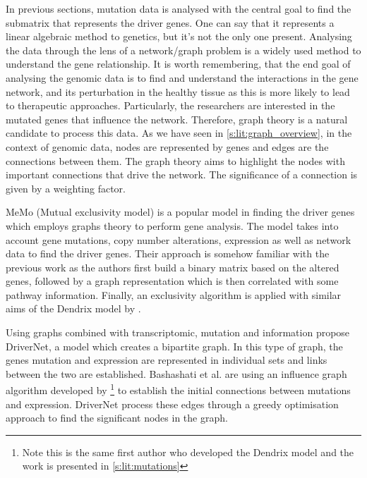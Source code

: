 In previous sections, mutation data is analysed with the central goal to find the submatrix that represents the driver genes. One can say that it represents a linear algebraic method to genetics, but it's not the only one present. Analysing the data through the lens of a network/graph problem is a widely used method to understand the gene relationship. It is worth remembering, that the end goal of analysing the genomic data is to find and understand the interactions in the gene network, and its perturbation in the healthy tissue as this is more likely to lead to therapeutic approaches. Particularly, the researchers are interested in the mutated genes that influence the network. Therefore, graph theory is a natural candidate to process this data. As we have seen in \cref{s:lit:graph_overview}, in the context of genomic data, nodes are represented by genes and edges are the connections between them. The graph theory aims to highlight the nodes with important connections that drive the network. The significance of a connection is given by a weighting factor.

MeMo (Mutual exclusivity model)\cite{Ciriello2012-hi} is a popular model in finding the driver genes which employs graphs theory to perform gene analysis. The model takes into account gene mutations, copy number alterations, expression as well as network data to find the driver genes. Their approach is somehow familiar with the previous work as the authors first build a binary matrix based on the altered genes, followed by a graph representation which is then correlated with some pathway information. Finally, an exclusivity algorithm is applied with similar aims of the Dendrix model by \citet{Vandin2012-cf}.

Using graphs combined with transcriptomic, mutation and information \citet{Bashashati2012-lk} propose DriverNet, a model which creates a bipartite graph. In this type of graph, the genes mutation and expression are represented in individual sets and links between the two are established. Bashashati et al. are using an influence graph algorithm developed by \citet{Vandin2011-bs}\footnote{Note this is the same first author who developed the Dendrix model and the work is presented in \cref{s:lit:mutations}} to establish the initial connections between mutations and expression. DriverNet process these edges through a greedy optimisation approach to find the significant nodes in the graph. 

